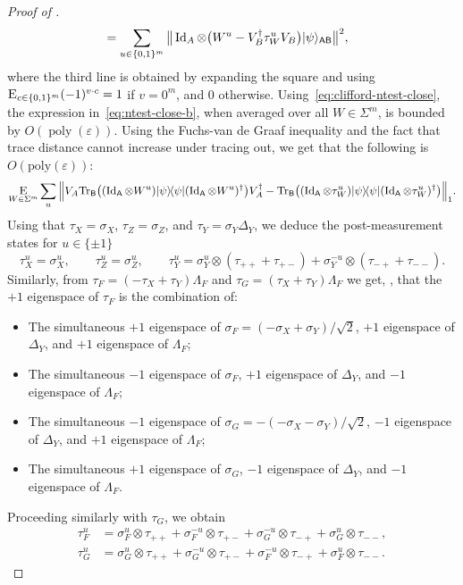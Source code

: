 \documentclass{toc}
\newcommand{\ket}[1]{|#1\rangle}
\newcommand{\bra}[1]{\langle#1|}
\newcommand{\proj}[1]{\ket{#1}\!\bra{#1}}
\newcommand{\Tr}{\mbox{\rm Tr}}
\newcommand{\Id}{\ensuremath{\mathop{\rm Id}\nolimits}}
\newcommand{\Es}[1]{\ensuremath{\mathop{\textsc{E}}}_{#1}} %
\DeclareMathOperator{\poly}{poly}
\newcommand{\reg}[1]{{\textsf{#1}}}
\newcommand{\eps}{\varepsilon}
\newcommand{\phase}{\Lambda}
\begin{document}
\begin{proof}[Proof of ]
\begin{align}
&= \sum_{u\in\{0,1\}^m}\big\|  \Id_A \otimes \big(  W^{u} - V_B^\dagger\tau_{W}^{u} V_B\big)   \ket{\psi}_{\reg{AB}} \big\|^2, \label{eq:ntest-close-b}  
\end{align}
where the third line is obtained by expanding the square and using
  $\Es{c\in\{0,1\}^m} (-1)^{v \cdot c} = 1$ if $v=0^m$, and $0$ otherwise. Using~\eqref{eq:clifford-ntest-close}, the expression in~\eqref{eq:ntest-close-b}, when averaged over all $W\in\Sigma^{ m}$, is bounded by $O(\poly(\eps))$. Using the Fuchs-van de Graaf inequality and the fact that trace distance cannot increase under tracing out, we get that the following is $O(\mathrm{poly}(\eps))$:
\begin{equation}\label{eq:ntest-close-c}
\Es{W\in\Sigma^{m}}\sum_{u} \Big\| V_A\Tr_\reg{B}\big( (\Id_\reg{A} \otimes W^{u})\proj{\psi}(\Id_\reg{A} \otimes W^{u})^\dagger \big) V_A^\dagger- \Tr_\reg{B}\big( (\Id_\reg{A} \otimes \tau_W^{u})\proj{\psi}(\Id_\reg{A} \otimes \tau_W^{u})^\dagger \big) \Big\|_1. \end{equation}
Using that $\tau_X = \sigma_X$, $\tau_Z = \sigma_Z$, and $\tau_Y = \sigma_Y \Delta_Y$, we deduce the post-measurement states for $u\in\{\pm 1\}$
$$ \tau_X^u = \sigma_X^u, \qquad \tau_Z^u = \sigma_Z^u,\qquad \tau_Y^u = \sigma_{Y}^u \otimes (\tau_{++}+\tau_{+-}) + \sigma_{Y}^{-u} \otimes (\tau_{-+}+\tau_{--}).$$ 
Similarly, from $\tau_F = (-\tau_X + \tau_Y)\phase_F$ and $\tau_G = (\tau_X + \tau_Y)\phase_F$ we %
get, \eg, that   %
the $+1$ eigenspace of $\tau_F$ is the combination of:
\begin{itemize}[nolistsep]
\item The simultaneous $+1$ eigenspace of $\sigma_F = (-\sigma_X+\sigma_Y)/\sqrt{2}$, $+1$ eigenspace of $\Delta_Y$, and $+1$ eigenspace of $\phase_F$;
\item The simultaneous $-1$ eigenspace of $\sigma_F$, $+1$ eigenspace of $\Delta_Y$, and $-1$ eigenspace of $\phase_F$;
\item The simultaneous $-1$ eigenspace of $\sigma_G = -(-\sigma_X-\sigma_Y)/\sqrt{2}$, $-1$ eigenspace of $\Delta_Y$, and $+1$ eigenspace of $\phase_F$;
\item The simultaneous $+1$ eigenspace of $\sigma_G$, $-1$ eigenspace of $\Delta_Y$, and $-1$ eigenspace of $\phase_F$.
\end{itemize}

Proceeding similarly with $\tau_G$, we obtain 
\begin{align*}
 \tau_F^u &= \sigma_F^u \otimes \tau_{++} + \sigma_F^{-u} \otimes \tau_{+-} + \sigma_G^{-u} \otimes \tau_{-+} + \sigma_G^u \otimes \tau_{--},\\
 \tau_G^u &= \sigma_G^u \otimes \tau_{++} + \sigma_G^{-u} \otimes \tau_{+-} + \sigma_F^{-u} \otimes \tau_{-+} + \sigma_F^u \otimes \tau_{--}.
\end{align*}


\end{proof}
\end{document}
